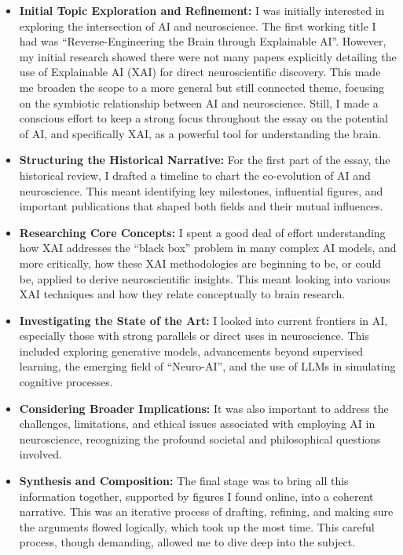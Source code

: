 \documentclass[11pt,a4paper]{article}
\begin{document}
\begin{itemize}
    \item \textbf{Initial Topic Exploration and Refinement:} I was initially interested in exploring the intersection of AI and neuroscience. The first working title I had was ``Reverse-Engineering the Brain through Explainable AI''. However, my initial research showed there were not many papers explicitly detailing the use of Explainable AI (XAI) for direct neuroscientific discovery. This made me broaden the scope to a more general but still connected theme, focusing on the symbiotic relationship between AI and neuroscience. Still, I made a conscious effort to keep a strong focus throughout the essay on the potential of AI, and specifically XAI, as a powerful tool for understanding the brain.

    \item \textbf{Structuring the Historical Narrative:} For the first part of the essay, the historical review, I drafted a timeline to chart the co-evolution of AI and neuroscience. This meant identifying key milestones, influential figures, and important publications that shaped both fields and their mutual influences.

    \item \textbf{Researching Core Concepts:} I spent a good deal of effort understanding how XAI addresses the ``black box'' problem in many complex AI models, and more critically, how these XAI methodologies are beginning to be, or could be, applied to derive neuroscientific insights. This meant looking into various XAI techniques and how they relate conceptually to brain research.

    \item \textbf{Investigating the State of the Art:} I looked into current frontiers in AI, especially those with strong parallels or direct uses in neuroscience. This included exploring generative models, advancements beyond supervised learning, the emerging field of ``Neuro-AI'', and the use of LLMs in simulating cognitive processes.

    \item \textbf{Considering Broader Implications:} It was also important to address the challenges, limitations, and ethical issues associated with employing AI in neuroscience, recognizing the profound societal and philosophical questions involved.

    \item \textbf{Synthesis and Composition:} The final stage was to bring all this information together, supported by figures I found online, into a coherent narrative. This was an iterative process of drafting, refining, and making sure the arguments flowed logically, which took up the most time. This careful process, though demanding, allowed me to dive deep into the subject.
\end{itemize}
\end{document}

